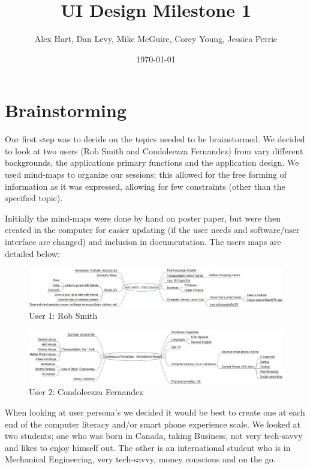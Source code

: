 \documentclass{article}
\title{UI Design Milestone 1}
\author{Alex Hart, Dan Levy, Mike McGuire, Corey Young, Jessica Perrie}
\date{\today}
\begin{document}
\maketitle

\section{Brainstorming}
Our first step was to decide on the topics needed to be brainstormed. We decided
to look at two users (Rob Smith and Condoleezza Fernandez) from vary different
backgrounds, the applications primary functions and the application design.
We used mind-maps to organize our sessions; this allowed for the free forming of
information as it was expressed, allowing for few constraints (other than the
specified topic). 

Initially the mind-maps were done by hand on poster paper, but were then created
in the computer for easier updating (if the user needs and software/user
interface are changed) and inclusion in documentation. The users maps are
detailed below:

\begin{figure}
\includegraphics[width=\textwidth]{img/Rob.jpg}
\caption{User 1: Rob Smith}
\end{figure}

\begin{figure}
\includegraphics[width=\textwidth]{img/Condoleezza.jpg}
\caption{User 2: Condoleezza Fernandez}
\end{figure}

When looking at user persona's we decided it would be best to create one at each
end of the computer literacy and/or smart phone experience scale. We looked at
two students; one who was born in Canada, taking Business, not very tech-savvy
and likes to enjoy himself out. The other is an international student who is in
Mechanical Engineering, very tech-savvy, money conscious and on the go.
\end{document}
